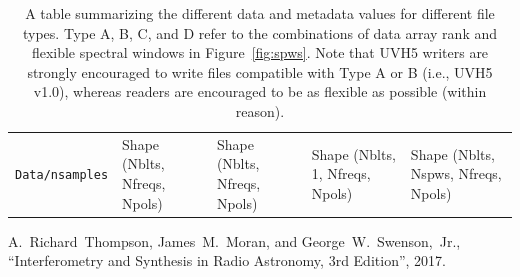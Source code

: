 \documentclass[11pt, oneside]{article}
\begin{document}
\begin{table}[t]
\begin{center}
\begin{tabular}{ m{8em} | m{10em} | m{10em} | m{10em} | m{10em}}
      \texttt{Data/nsamples} & Shape (Nblts, Nfreqs, Npols) & Shape (Nblts, Nfreqs, Npols) & Shape (Nblts, 1, Nfreqs, Npols) & Shape (Nblts, Nspws, Nfreqs, Npols) \\
    \end{tabular}
  \end{center}
  \caption{A table summarizing the different data and metadata values for
    different file types. Type A, B, C, and D refer to the combinations of data
    array rank and flexible spectral windows in Figure~\ref{fig:spws}. Note that
    UVH5 writers are strongly encouraged to write files compatible with Type A
    or B (i.e., UVH5 v1.0), whereas readers are encouraged to be as flexible as
    possible (within reason).}
  \label{table:spw}
\end{table}


\begin{thebibliography}{9}

 A.~Richard~Thompson, James~M.~Moran, and George~W.~Swenson,~Jr.,
  ``Interferometry and Synthesis in Radio Astronomy, 3rd Edition'', 2017.

\end{thebibliography}

\newpage
\end{document}

